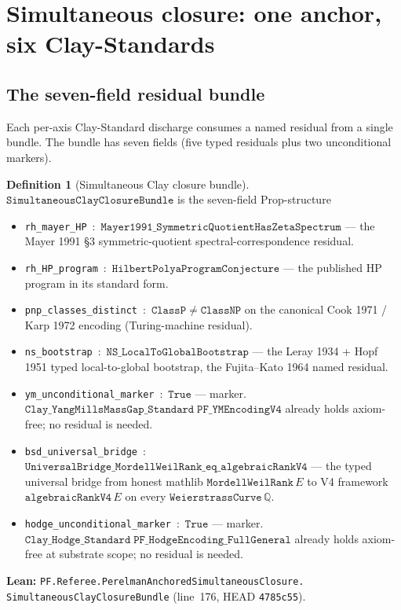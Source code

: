 \documentclass[11pt,a4paper]{article}
\theoremstyle{plain}
\theoremstyle{definition}
\newtheorem{definition}[theorem]{Definition}
\begin{document}
\section{Simultaneous closure: one anchor, six Clay-Standards}
\label{sec:simultaneous-closure}

\subsection{The seven-field residual bundle}
\label{sec:bundle}

Each per-axis Clay-Standard discharge consumes a named residual
from a single bundle. The bundle has seven fields (five typed
residuals plus two unconditional markers).

\begin{definition}[Simultaneous Clay closure bundle]
\label{def:bundle}
$\mathtt{SimultaneousClayClosureBundle}$ is the seven-field
Prop-structure
\begin{itemize}[leftmargin=*,nosep]
\item \texttt{rh\_mayer\_HP} \,:\,
  $\mathtt{Mayer1991\_SymmetricQuotientHasZetaSpectrum}$ ---
  the Mayer 1991 \S3 symmetric-quotient spectral-correspondence
  residual.
\item \texttt{rh\_HP\_program} \,:\,
  $\mathtt{HilbertPolyaProgramConjecture}$ --- the published HP
  program in its standard form.
\item \texttt{pnp\_classes\_distinct} \,:\,
  $\mathtt{ClassP} \neq \mathtt{ClassNP}$ on the canonical
  Cook 1971 / Karp 1972 encoding (Turing-machine residual).
\item \texttt{ns\_bootstrap} \,:\,
  $\mathtt{NS\_LocalToGlobalBootstrap}$ --- the Leray 1934 +
  Hopf 1951 typed local-to-global bootstrap, the
  Fujita--Kato 1964 named residual.
\item \texttt{ym\_unconditional\_marker} \,:\, $\mathtt{True}$
  --- marker. $\mathtt{Clay\_YangMillsMassGap\_Standard\;PF\_YMEncodingV4}$
  already holds axiom-free; no residual is needed.
\item \texttt{bsd\_universal\_bridge} \,:\,
  $\mathtt{UniversalBridge\_MordellWeilRank\_eq\_algebraicRankV4}$
  --- the typed universal bridge from honest mathlib
  $\mathtt{MordellWeilRank}\, E$ to V4 framework
  $\mathtt{algebraicRankV4}\, E$ on every
  $\mathtt{WeierstrassCurve}\, \mathbb{Q}$.
\item \texttt{hodge\_unconditional\_marker} \,:\, $\mathtt{True}$
  --- marker.
  $\mathtt{Clay\_Hodge\_Standard\;PF\_HodgeEncoding\_FullGeneral}$
  already holds axiom-free at substrate scope; no residual is
  needed.
\end{itemize}
\textbf{Lean:}
\texttt{PF.Referee.PerelmanAnchoredSimultaneousClosure.\\
SimultaneousClayClosureBundle}
(line~176, HEAD \texttt{4785c55}).
\end{definition}
\end{document}
